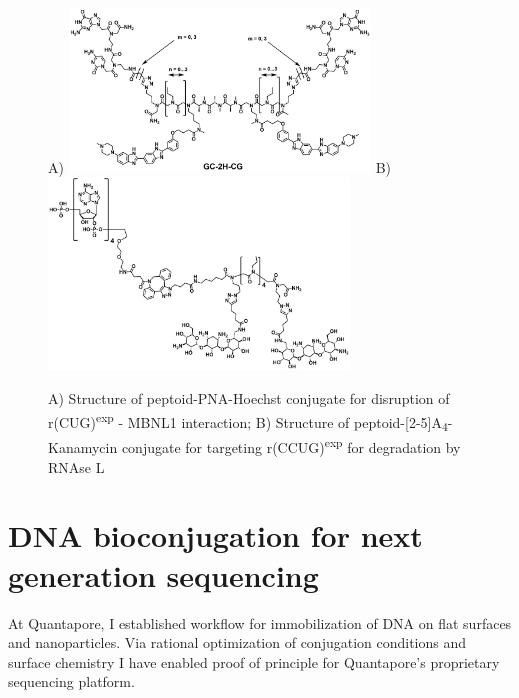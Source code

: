 \documentclass{tufte-handout}
\begin{document}
\begin{figure}
	A)
	\includegraphics[width=80mm]{GC-2H-CG.png}
	B)
	\includegraphics[width=80mm]{2Kan-p2-5A4.png}
	\caption{A) Structure of peptoid-PNA-Hoechst conjugate for disruption of r(CUG)\textsuperscript{exp} - MBNL1 interaction; B) Structure of peptoid-[2-5]A\textsubscript{4}-Kanamycin conjugate for targeting r(CCUG)\textsuperscript{exp} for degradation by RNAse L}
	\label{fig:kanamycin-dimers}
\end{figure}

\section{DNA bioconjugation for next generation sequencing}

At Quantapore, I established workflow for immobilization of DNA on flat surfaces and nanoparticles. Via rational optimization of conjugation conditions and surface chemistry I have enabled proof of principle for Quantapore's proprietary sequencing platform.



\end{document}
